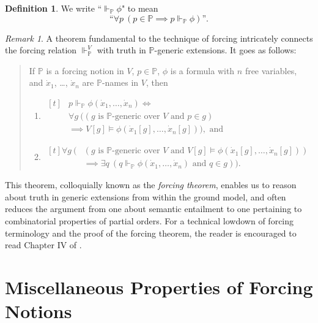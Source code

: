 \documentclass[12pt, twoside]{memoir}
\numberwithin{equation}{section}
\theoremstyle{definition}
\newtheorem{defi}[thm]{Definition}
\theoremstyle{remark}
\newtheorem{rem}[thm]{Remark}
\theoremstyle{definition}
\theoremstyle{definition}
\theoremstyle{definition}
\theoremstyle{remark}
\begin{document}
\begin{defi}
We write ``$\Vdash_{\mathbb{P}} \phi$" to mean $$\text{``} \forall p \ (p \in \mathbb{P} \implies p \Vdash_{\mathbb{P}} \phi) \text{''.}$$ 
\end{defi}

\begin{rem}
A theorem fundamental to the technique of forcing intricately connects the forcing relation $\Vdash_{\mathbb{P}}^V$ with truth in $\mathbb{P}$-generic extensions. It goes as follows:
\begin{quote}
If $\mathbb{P}$ is a forcing notion in $V$, $p \in \mathbb{P}$, $\phi$ is a formula with $n$ free variables, and $\dot{x}_1$, \dots, $\dot{x}_n$ are $\mathbb{P}$-names in $V$, then
\begin{enumerate}[label=(\alph*)]
    \item 
    \!
    $\begin{aligned}[t]
    & p \Vdash_{\mathbb{P}} \phi(\dot{x}_1, \dots, \dot{x}_n) \iff \\
    & \forall g \ ((g \text{ is } \mathbb{P} \text{-generic over } V \text{ and } p \in g) \\
    & \implies V[g] \models \phi(\dot{x}_1[g], \dots, \dot{x}_n[g])), \text{ and}
    \end{aligned}$
    \item 
    \!
    $\begin{aligned}[t]
    \forall g \ ( & (g \text{ is } \mathbb{P} \text{-generic over } V \text{ and } V[g] \models \phi(\dot{x}_1[g], \dots, \dot{x}_n[g])) \\
    & \implies \exists q \ (q \Vdash_{\mathbb{P}} \phi(\dot{x}_1, \dots, \dot{x}_n) \text{ and } q \in g)) \text{.}
    \end{aligned}$
\end{enumerate}
\end{quote}
This theorem, colloquially known as the \emph{forcing theorem}, enables us to reason about truth in generic extensions from within the ground model, and often reduces the argument from one about semantic entailment to one pertaining to combinatorial properties of partial orders. For a technical lowdown of forcing terminology and the proof of the forcing theorem, the reader is encouraged to read Chapter IV of \cite{kunen}. 
\end{rem}

\section{Miscellaneous Properties of Forcing Notions}\label{sectmpfc}
\end{document}
